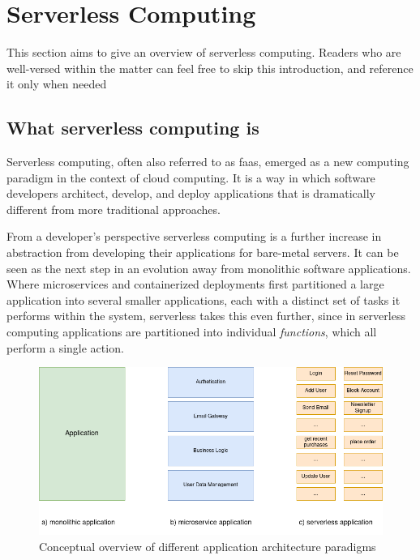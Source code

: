 \section{Serverless Computing}
This section aims to give an overview of serverless computing.
Readers who are well-versed within the matter can feel free to skip this introduction, and reference it only when needed
\subsection{What serverless computing is}
Serverless computing, often also referred to as \gls{faas}, emerged as a new computing paradigm in the context of cloud computing.
It is a way in which software developers architect, develop, and deploy applications that is dramatically different from more traditional approaches.

From a developer's perspective serverless computing is a further increase in abstraction from developing their applications for bare-metal servers\cite{jonasCloudProgrammingSimplified2019}.
It can be seen as the next step in an evolution away from monolithic software applications.
Where microservices and containerized deployments first partitioned a large application into several smaller applications, each with a distinct set of tasks it performs within the system, serverless takes this even further, since in serverless computing applications are partitioned into individual \textit{functions}, which all perform a single action\cite{khandelwalTaureauDeconstructingServerless2020}.

\begin{figure}
    \centering
    \includegraphics[width=\columnwidth]{graphics/diagrams/monolith_micro_serverless.drawio.png}
    \caption{Conceptual overview of different application architecture paradigms}
    \label{fig:mono_micro_serverless}
\end{figure}

